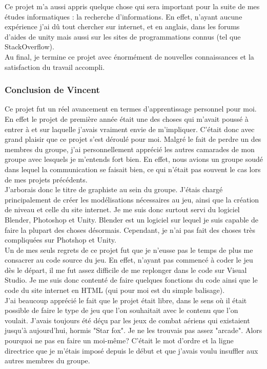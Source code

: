 \documentclass[12pt, titlepage]{article}
\begin{document}
\begin{spacing}{1.5}
Ce projet m'a aussi appris quelque chose qui sera important pour la suite de mes études informatiques : la recherche d'informations. En effet, n'ayant aucune expérience j'ai dû tout chercher sur internet, et en anglais, dans les forums d'aides de unity mais aussi sur les sites de programmations connus (tel que StackOverflow). \\

Au final, je termine ce projet avec énormément de nouvelles connaissances et la satisfaction du travail accompli.

\subsubsection{Conclusion de Vincent}

Ce projet fut un réel avancement en termes d’apprentissage personnel pour moi. En effet le projet de première année était une des choses qui m’avait poussé à entrer à  et sur laquelle j’avais vraiment envie de m’impliquer. C’était donc avec grand plaisir que ce projet s’est déroulé pour moi. Malgré le fait de perdre un des membres du groupe, j’ai personnellement apprécié les autres camarades de mon groupe avec lesquels je m’entends fort bien. En effet, nous avions un groupe soudé dans lequel la communication se faisait bien, ce qui n’était pas souvent le cas lors de mes projets précédents.\\

J’arborais donc le titre de graphiste au sein du groupe. J’étais chargé principalement de créer les modélisations nécessaires au jeu, ainsi que la création de niveau et celle du site internet. Je me suis donc surtout servi du logiciel Blender, Photoshop et Unity. Blender est un logiciel sur lequel je suis capable de faire la plupart des choses désormais. Cependant, je n’ai pas fait des choses très compliquées sur Photshop et Unity.\\

Un de mes seuls regrets de ce projet fut que je n’eusse pas le temps de plus me consacrer au code source du jeu. En effet, n’ayant pas commencé à coder le jeu dès le départ, il me fut assez difficile de me replonger dans le code sur Visual Studio. Je me suis donc contenté de faire quelques fonctions du code ainsi que le code du site internet en HTML (qui pour moi est du simple balisage).\\

J’ai beaucoup apprécié le fait que le projet était libre, dans le sens où il était possible de faire le type de jeu que l’on souhaitait avec le contenu que l’on voulait. J’avais toujours été déçu par les jeux de combat aériens qui existaient jusqu’à aujourd’hui, hormis "Star fox". Je ne les trouvais pas assez "arcade". Alors pourquoi ne pas en faire un moi-même? C’était le mot d’ordre et la ligne directrice que je m’étais imposé depuis le début et que j’avais voulu insuffler aux autres membres du groupe.\\


\end{spacing}
\end{document}
